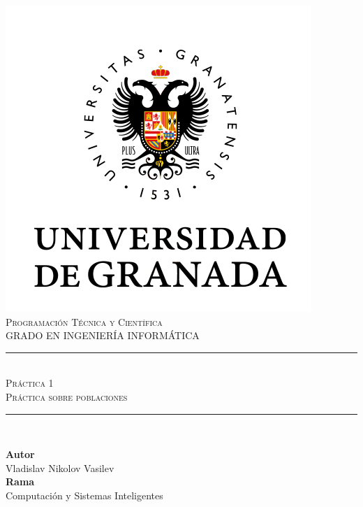 \documentclass[11pt,a4paper]{article}
\newcommand{\asignatura}{Programación Técnica y Científica}
\newcommand{\autor}{Vladislav Nikolov Vasilev}
\newcommand{\titulo}{Práctica 1}
\newcommand{\subtitulo}{Práctica sobre poblaciones}
\begin{document}

\begin{titlepage}

\begin{minipage}{\textwidth}

\centering

\includegraphics[scale=0.5]{img/ugr.png}\\

\textsc{\Large \asignatura{}\\[0.2cm]}
\textsc{GRADO EN INGENIERÍA INFORMÁTICA}\\[1cm]

\noindent\rule[-1ex]{\textwidth}{1pt}\\[1.5ex]
\textsc{{\Huge \titulo\\[0.5ex]}}
\textsc{{\Large \subtitulo\\}}
\noindent\rule[-1ex]{\textwidth}{2pt}\\[3.5ex]

\end{minipage}

\vspace{0.5cm}

\begin{minipage}{\textwidth}

\centering

\textbf{Autor}\\ {\autor{}}\\[2.5ex]
\textbf{Rama}\\ {Computación y Sistemas Inteligentes}\\[2.5ex]
\vspace{0.3cm}


\end{minipage}
\end{titlepage}
\end{document}
